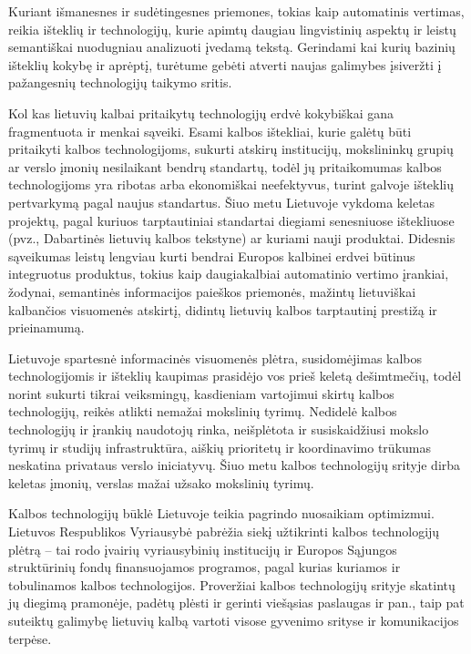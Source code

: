 \begin{multicols}{2}
Kuriant išmanesnes ir sudėtingesnes priemones, tokias kaip automatinis vertimas, reikia išteklių ir technologijų, kurie apimtų daugiau lingvistinių aspektų ir leistų semantiškai  nuodugniau analizuoti įvedamą tekstą. Gerindami kai kurių bazinių išteklių kokybę ir aprėptį, turėtume gebėti atverti naujas galimybes įsiveržti į pažangesnių technologijų taikymo sritis.

Kol kas lietuvių kalbai pritaikytų technologijų erdvė kokybiškai gana fragmentuota ir menkai sąveiki. Esami kalbos ištekliai, kurie galėtų būti pritaikyti kalbos technologijoms, sukurti atskirų institucijų, mokslininkų grupių ar verslo įmonių nesilaikant bendrų standartų, todėl jų pritaikomumas kalbos technologijoms yra ribotas arba ekonomiškai neefektyvus, turint galvoje išteklių pertvarkymą pagal naujus standartus.  Šiuo metu Lietuvoje vykdoma keletas projektų, pagal kuriuos tarptautiniai standartai diegiami senesniuose ištekliuose (pvz., Dabartinės lietuvių kalbos tekstyne) ar kuriami nauji produktai. Didesnis sąveikumas leistų lengviau kurti bendrai Europos kalbinei erdvei būtinus integruotus produktus, tokius kaip daugiakalbiai automatinio vertimo įrankiai, žodynai, semantinės informacijos paieškos priemonės, mažintų lietuviškai kalbančios visuomenės atskirtį, didintų lietuvių kalbos tarptautinį prestižą ir prieinamumą.
\columnbreak

Lietuvoje spartesnė informacinės visuomenės plėtra, susidomėjimas kalbos technologijomis ir išteklių kaupimas prasidėjo vos prieš keletą dešimtmečių, todėl norint sukurti tikrai veiksmingų, kasdieniam vartojimui skirtų kalbos technologijų, reikės atlikti nemažai mokslinių tyrimų. Nedidelė kalbos technologijų ir įrankių naudotojų rinka, neišplėtota ir susiskaidžiusi mokslo tyrimų ir studijų infrastruktūra, aiškių prioritetų ir koordinavimo trūkumas neskatina privataus verslo iniciatyvų. Šiuo metu kalbos technologijų srityje dirba keletas įmonių, verslas mažai užsako mokslinių tyrimų. 

Kalbos technologijų būklė Lietuvoje teikia pagrindo nuosaikiam optimizmui. Lietuvos Respublikos Vyriausybė pabrėžia siekį užtikrinti kalbos technologijų plėtrą – tai rodo įvairių vyriausybinių institucijų ir Europos Sąjungos struktūrinių fondų finansuojamos programos, pagal kurias kuriamos ir tobulinamos kalbos technologijos. Proveržiai kalbos technologijų srityje skatintų jų diegimą pramonėje, padėtų plėsti ir gerinti viešąsias paslaugas ir pan., taip pat suteiktų galimybę lietuvių kalbą vartoti visose gyvenimo srityse ir komunikacijos terpėse.


\end{multicols}
